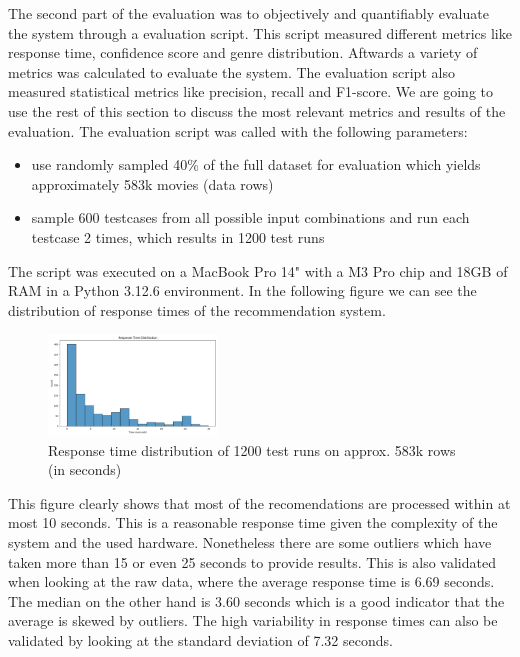 \documentclass[12pt,a4paper]{article}
\begin{document}

\noindent The second part of the evaluation was to objectively and quantifiably evaluate the system through a evaluation script.
This script measured different metrics like response time, confidence score and genre distribution.
Aftwards a variety of metrics was calculated to evaluate the system.
The evaluation script also measured statistical metrics like precision, recall and F1-score.
We are going to use the rest of this section to discuss the most relevant metrics and results of the evaluation.
The evaluation script was called with the following parameters:
\begin{itemize}
  \item use randomly sampled 40\% of the full dataset for evaluation which yields approximately 583k movies (data rows)
  \item sample 600 testcases from all possible input combinations and run each testcase 2 times, which results in 1200 test runs
\end{itemize}

\noindent The script was executed on a MacBook Pro 14" with a M3 Pro chip and 18GB of RAM in a Python 3.12.6 environment.
In the following figure we can see the distribution of response times of the recommendation system.

\begin{figure}[H]
  \centering
  \includegraphics[width=0.4\textwidth]{../assets/response_time_dist.png}
  \caption{Response time distribution of 1200 test runs on approx. 583k rows (in seconds)}
\end{figure}

\noindent This figure clearly shows that most of the recomendations are processed within at most 10 seconds.
This is a reasonable response time given the complexity of the system and the used hardware.
Nonetheless there are some outliers which have taken more than 15 or even 25 seconds to provide results.
This is also validated when looking at the raw data, where the average response time is 6.69 seconds.
The median on the other hand is 3.60 seconds which is a good indicator that the average is skewed by outliers.
The high variability in response times can also be validated by looking at the standard deviation of 7.32 seconds.
\end{document}
